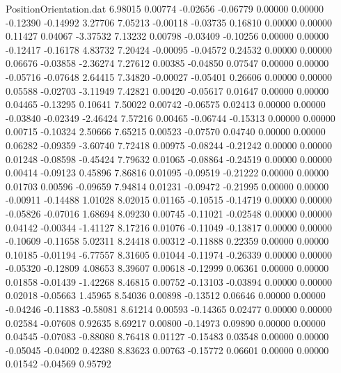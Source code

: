 \begin{filecontents}{PositionOrientation.dat}
   6.98015    0.00774   -0.02656    -0.06779    0.00000    0.00000   -0.12390   -0.14992    3.27706
   7.05213   -0.00118   -0.03735     0.16810    0.00000    0.00000    0.11427    0.04067   -3.37532
   7.13232    0.00798   -0.03409    -0.10256    0.00000    0.00000   -0.12417   -0.16178    4.83732
   7.20424   -0.00095   -0.04572     0.24532    0.00000    0.00000    0.06676   -0.03858   -2.36274
   7.27612    0.00385   -0.04850     0.07547    0.00000    0.00000   -0.05716   -0.07648    2.64415
   7.34820   -0.00027   -0.05401     0.26606    0.00000    0.00000    0.05588   -0.02703   -3.11949
   7.42821    0.00420   -0.05617     0.01647    0.00000    0.00000    0.04465   -0.13295    0.10641
   7.50022    0.00742   -0.06575     0.02413    0.00000    0.00000   -0.03840   -0.02349   -2.46424
   7.57216    0.00465   -0.06744    -0.15313    0.00000    0.00000    0.00715   -0.10324    2.50666
   7.65215    0.00523   -0.07570     0.04740    0.00000    0.00000    0.06282   -0.09359   -3.60740
   7.72418    0.00975   -0.08244    -0.21242    0.00000    0.00000    0.01248   -0.08598   -0.45424
   7.79632    0.01065   -0.08864    -0.24519    0.00000    0.00000    0.00414   -0.09123    0.45896
   7.86816    0.01095   -0.09519    -0.21222    0.00000    0.00000    0.01703    0.00596   -0.09659
   7.94814    0.01231   -0.09472    -0.21995    0.00000    0.00000   -0.00911   -0.14488    1.01028
   8.02015    0.01165   -0.10515    -0.14719    0.00000    0.00000   -0.05826   -0.07016    1.68694
   8.09230    0.00745   -0.11021    -0.02548    0.00000    0.00000    0.04142   -0.00344   -1.41127
   8.17216    0.01076   -0.11049    -0.13817    0.00000    0.00000   -0.10609   -0.11658    5.02311
   8.24418    0.00312   -0.11888     0.22359    0.00000    0.00000    0.10185   -0.01194   -6.77557
   8.31605    0.01044   -0.11974    -0.26339    0.00000    0.00000   -0.05320   -0.12809    4.08653
   8.39607    0.00618   -0.12999     0.06361    0.00000    0.00000    0.01858   -0.01439   -1.42268
   8.46815    0.00752   -0.13103    -0.03894    0.00000    0.00000    0.02018   -0.05663    1.45965
   8.54036    0.00898   -0.13512     0.06646    0.00000    0.00000   -0.04246   -0.11883   -0.58081
   8.61214    0.00593   -0.14365     0.02477    0.00000    0.00000    0.02584   -0.07608    0.92635
   8.69217    0.00800   -0.14973     0.09890    0.00000    0.00000    0.04545   -0.07083   -0.88080
   8.76418    0.01127   -0.15483     0.03548    0.00000    0.00000   -0.05045   -0.04002    0.42380
   8.83623    0.00763   -0.15772     0.06601    0.00000    0.00000    0.01542   -0.04569    0.95792

\end{filecontents}
